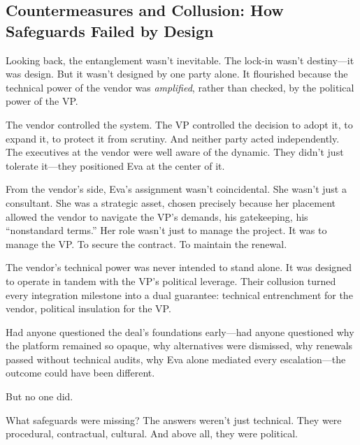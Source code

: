 \subsection{Countermeasures and Collusion: How Safeguards Failed by Design}

Looking back, the entanglement wasn’t inevitable. The lock-in wasn’t destiny—it was design. But it wasn’t designed by one party alone. It flourished because the technical power of the vendor was \textit{amplified}, rather than checked, by the political power of the VP.

The vendor controlled the system. The VP controlled the decision to adopt it, to expand it, to protect it from scrutiny. And neither party acted independently. The executives at the vendor were well aware of the dynamic. They didn’t just tolerate it—they positioned Eva at the center of it.

From the vendor’s side, Eva’s assignment wasn’t coincidental. She wasn’t just a consultant. She was a strategic asset, chosen precisely because her placement allowed the vendor to navigate the VP’s demands, his gatekeeping, his “nonstandard terms.” Her role wasn’t just to manage the project. It was to manage the VP. To secure the contract. To maintain the renewal.

The vendor’s technical power was never intended to stand alone. It was designed to operate in tandem with the VP’s political leverage. Their collusion turned every integration milestone into a dual guarantee: technical entrenchment for the vendor, political insulation for the VP.

Had anyone questioned the deal’s foundations early—had anyone questioned why the platform remained so opaque, why alternatives were dismissed, why renewals passed without technical audits, why Eva alone mediated every escalation—the outcome could have been different.

But no one did.

What safeguards were missing? The answers weren’t just technical. They were procedural, contractual, cultural. And above all, they were political.

